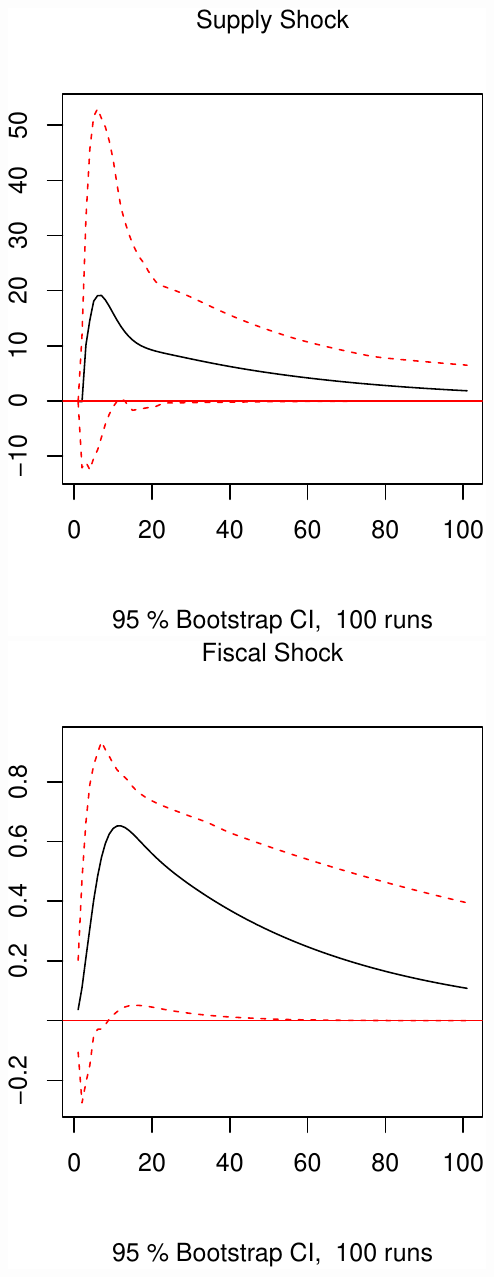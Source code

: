 \documentclass[11pt,preprint, authoryear]{elsarticle}
\numberwithin{equation}{section}
\numberwithin{figure}{section}
\numberwithin{table}{section}
\begin{document}
\includegraphics{TS_proj_files/figure-latex/unnamed-chunk-34-1.pdf}
\includegraphics{TS_proj_files/figure-latex/unnamed-chunk-34-2.pdf}
\end{document}
